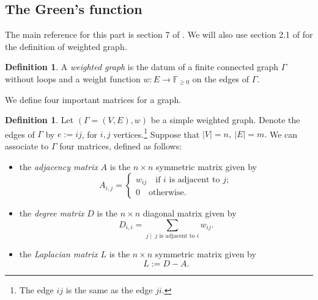 \documentclass[a4paper,12 pt,titlepage,twoside]{book}
\newcommand{\numberset}{\mathbb}
\newcommand{\F}{\numberset{F}}
\theoremstyle{plain}
\theoremstyle{theorem}
\theoremstyle{definition}
\newtheorem{defn}[thm]{Definition}
\theoremstyle{remark}
\begin{document}
	\subsection{The Green's function}
	The main reference for this part is section 7 of \cite{MR3488379}. We will also use section 2.1 of \cite{MR2794031} for the definition of weighted graph.
	\begin{defn}
		A \emph{weighted graph} is the datum of a finite connected graph $\Gamma$ without loops and a weight function $w \colon E \rightarrow \F_{\ge 0}$ on the edges of $\Gamma.$
	\end{defn}
	We define four important matrices for a graph.
	\begin{defn}
		Let $(\Gamma=(V,E), w)$ be a simple weighted graph. Denote the edges of $\Gamma$ by $e:=ij$, for $i,j$ vertices.\footnote{The edge $ij$ is the same as the edge $ji$.} Suppose that $|V|=n, \ |E|=m.$ We can associate to $\Gamma$ four matrices, defined as follows: \begin{itemize}
			\item the \emph{adjacency matrix} $A$ is the $n \times n$ symmetric matrix given by $$A_{i,j} = \begin{cases}
			w_{ij} \quad \text{if $i$ is adjacent to } j; \\ 0 \quad \text{otherwise}.
			\end{cases}$$
			\item the \emph{degree matrix} $D$ is the $n \times n$ diagonal matrix given by $$D_{i,i} = \sum_{j \mid \ j \text{ is adjacent to } i} w_{ij}.$$
			\item the \emph{Laplacian matrix} $L$ is the $n \times n$ symmetric matrix given by $$L := D - A.$$
			

\end{itemize}
\end{defn}
\end{document}
